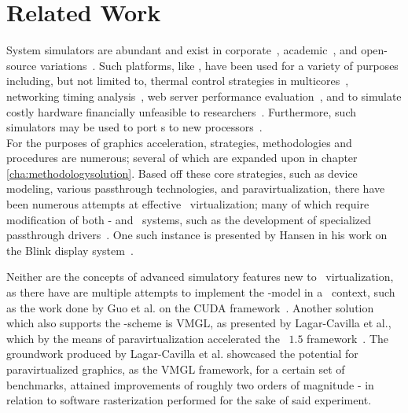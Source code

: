 
\chapter{Related Work}
\label{cha:relatedwork}
System simulators are abundant and exist in corporate~, academic~, and open-source variations~.
Such platforms, like \dvttermsimics , have been used for a variety of purposes including, but not limited to, thermal control strategies in multicores~, networking timing analysis~, web server performance evaluation~, and to simulate costly hardware financially unfeasible to researchers~.
Furthermore, such simulators may be used to port \dvttermos s to new processors~.\\

\noindent
For the purposes of graphics acceleration, strategies, methodologies and procedures are numerous; several of which are expanded upon in chapter \ref{cha:methodologysolution}.
Based off these core strategies, such as device modeling, various passthrough technologies, and paravirtualization, there have been numerous attempts at effective \dvttermgpu\ virtualization; many of which require modification of both \dvttermtarget - and \dvttermhost\ systems, such as the development of specialized passthrough drivers~.
One such instance is presented by Hansen in his work on the Blink display system~.

Neither are the concepts of advanced simulatory features new to \dvttermgpu\ virtualization, as there have are multiple attempts to implement the \dvttermcheckpointrestart -model in a \dvttermgpu\ context, such as the work done by Guo et al. on the CUDA framework~.
Another solution which also supports the \dvttermcheckpointrestart -scheme is VMGL, as presented by Lagar-Cavilla et al., which by the means of paravirtualization accelerated the \dvttermopengl\ $1.5$ framework~.
The groundwork produced by Lagar-Cavilla et al. showcased the potential for paravirtualized graphics, as the VMGL framework, for a certain set of benchmarks, attained improvements of roughly two orders of magnitude - in relation to software rasterization performed for the sake of said experiment.

